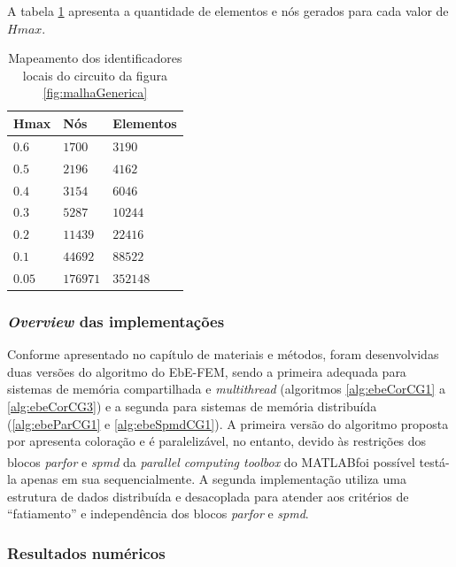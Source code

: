 \documentclass[
    12pt,               %
    openright,          %
    oneside,
    a4paper,            %
    english,            %
    french,             %
    spanish,            %
    brazil              %
    ]{abntex2}
\newcommand{\matlab}{MATLAB\textsuperscript{\textregistered}}
\begin{document}
A tabela \ref{tab:hmax} apresenta a quantidade de elementos e nós gerados para cada valor de $Hmax$.
\begin{table} 
	\centering
	\begin{tabular}{|l|l|l|}  
		\hline
		\textbf{Hmax} & \textbf{Nós} & \textbf{Elementos} \\ 
		\hline
		$0.6$ & $1700$ & $3190$ \\
		\hline
		$0.5$ & $2196$ & $4162$ \\
		\hline
		$0.4$ & $3154$ & $6046$ \\
		\hline
		$0.3$ & $5287$ & $10244$ \\
		\hline
		$0.2$ & $11439$ & $22416$ \\       
		\hline
		$0.1$ & $44692$ & $88522$ \\       
		\hline
		$0.05$ & $176971$ & $352148$ \\       
		\hline				
	\end{tabular}
	\caption{Mapeamento dos identificadores locais do circuito da figura \ref{fig:malhaGenerica}}
	\label{tab:hmax}
\end{table}

\subsubsection*{\textit{Overview} das implementações}
Conforme apresentado no capítulo de materiais e métodos, foram desenvolvidas duas versões do algoritmo  do EbE-FEM, sendo a primeira adequada para sistemas de memória compartilhada e \textit{multithread} (algoritmos \ref{alg:ebeCorCG1} a \ref{alg:ebeCorCG3}) e a segunda para sistemas de memória distribuída (\ref{alg:ebeParCG1} e \ref{alg:ebeSpmdCG1}).
A primeira versão do algoritmo proposta por  apresenta coloração e é paralelizável, no entanto, devido às restrições dos blocos \textit{parfor} e \textit{spmd} da \textit{parallel computing toolbox} do \matlab foi possível testá-la apenas em sua sequencialmente.
A segunda implementação utiliza uma estrutura de dados distribuída e desacoplada para atender aos critérios de ``fatiamento'' e independência dos blocos \textit{parfor} e \textit{spmd}.


\subsubsection*{Resultados numéricos}
\end{document}
